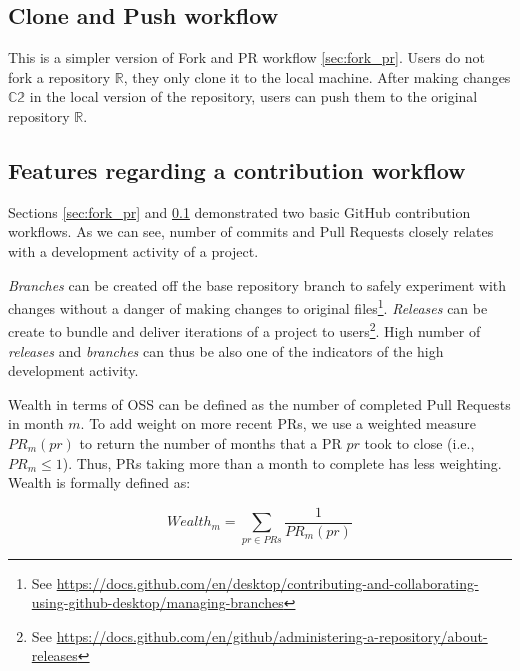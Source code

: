 \subsection{Clone and Push workflow}
\label{sec:clone_push}

This is a simpler version of Fork and PR workflow \ref{sec:fork_pr}.
Users do not fork a repository $\mathbb{R}$, they only clone it to the local machine.
After making changes $\mathbb{C2}$ in the local version of the repository, users can push them to the original repository $\mathbb{R}$.

\subsection{Features regarding a contribution workflow}

Sections \ref{sec:fork_pr} and \ref{sec:clone_push} demonstrated two basic GitHub contribution workflows.
As we can see, number of commits and Pull Requests closely relates with a development activity of a project.

\emph{Branches} can be created off the base repository branch to safely experiment with changes without a danger of making changes to original files\footnote{See \url{https://docs.github.com/en/desktop/contributing-and-collaborating-using-github-desktop/managing-branches}}.
\emph{Releases} can be create to bundle and deliver iterations of a project to users\footnote{See \url{https://docs.github.com/en/github/administering-a-repository/about-releases}}.
High number of \emph{releases} and \emph{branches} can thus be also one of the indicators of the high development activity.

Wealth in terms of OSS can be defined as the number of completed Pull Requests in month $m$.
To add weight on more recent PRs, we use a weighted measure $PR_m(pr)$ to return the number of months that a PR $pr$ took to close (i.e., $PR_m \leq 1$).
Thus, PRs taking more than a month to complete has less weighting.
Wealth is formally defined as:

\begin{equation}
    Wealth_m = \sum_{pr \in PRs} \frac{1}{PR_m(pr)}
\end{equation}
